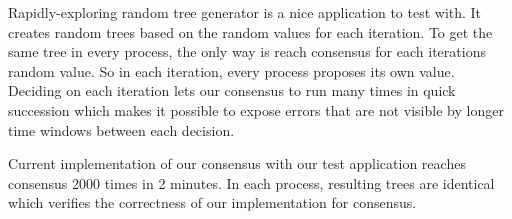 \documentclass[times, 12pt,twocolumn]{article}
\begin{document}
Rapidly-exploring random tree generator is a nice application to test with. It creates random trees based on the random values for each iteration. To get the same tree in every process, the only way is reach consensus for each iterations random value. So in each iteration, every process proposes its own value. Deciding on each iteration lets our consensus to run many times in quick succession which makes it possible to expose errors that are not visible by longer time windows between each decision.
 



Current implementation of our consensus with our test application reaches consensus 2000 times in 2 minutes. In each process, resulting trees are identical which verifies the correctness of our implementation for consensus.





 
\end{document}
